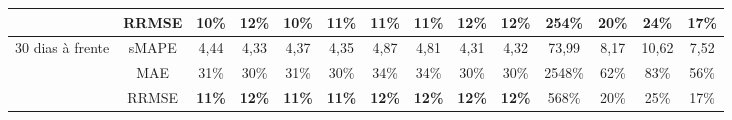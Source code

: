 \begin{landscape}
\begin{table}[H]
\begin{tabular}{@{}cccccccccccccc@{}}
		& RRMSE    & \textbf{10\%} & \textbf{12\%} & \textbf{10\%} & \textbf{11\%} & \textbf{11\%} & \textbf{11\%} & \textbf{12\%} & \textbf{12\%} & 254\%         & 20\% & 24\%  & 17\% \\ \midrule
		\multirow{3}{*}{30 dias à frente} & sMAPE    & 4,44          & 4,33          & 4,37          & 4,35          & 4,87          & 4,81          & 4,31          & 4,32          & 73,99         & 8,17 & 10,62 & 7,52 \\
		& MAE      & 31\%          & 30\%          & 31\%          & 30\%          & 34\%          & 34\%          & 30\%          & 30\%          & 2548\%        & 62\% & 83\%  & 56\% \\
		& RRMSE    & \textbf{11\%} & \textbf{12\%} & \textbf{11\%} & \textbf{11\%} & \textbf{12\%} & \textbf{12\%} & \textbf{12\%} & \textbf{12\%} & 568\%         & 20\% & 25\%  & 17\% \\ \cmidrule(l){1-14} 
	\end{tabular}
	
\end{table}

\newpage


\end{landscape}
